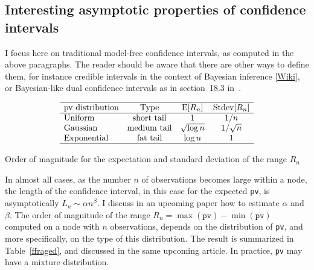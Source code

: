 \documentclass[oneside,10pt]{book}
\renewcommand{\arraystretch}{1.4} %
\begin{document}
\subsection{Interesting asymptotic properties of confidence intervals}

I focus here on traditional model-free confidence intervals, as computed in the above paragraphs. The reader should be aware that there are other ways to define them, for instance \textcolor{index}{credible intervals} in the context of
 \textcolor{index}{Bayesian inference} [\href{https://en.wikipedia.org/wiki/Bayesian_inference}{Wiki}], or 
 Bayesian-like \textcolor{index}{dual confidence intervals} as in section~18.3 in~\cite{vgelsevier}.


\renewcommand{\arraystretch}{1.2} %
\begin{center}
\begin{table}[H]
\[
\begin{array}{lccc}
\hline 
\text{pv distribution} & \text{Type} &  \text{E}[R_n] & \text{Stdev}[R_n] \\
\hline 
\text{Uniform} & \text{short tail} & 1 & 1/n \\
\text{Gaussian} & \text{medium tail} & \sqrt{\log n} & 1/\sqrt{n} \\
\text{Exponential} & \text{fat tail} & \log n & 1\\
\hline
\end{array}
\]
\caption{\label{ffraged}Order of magnitude for the expectation and standard deviation of the range $R_n$}
\end{table}
\end{center}

\renewcommand{\arraystretch}{1.0} %

In almost all cases, as the number $n$ of observations becomes large within a node, the length of the confidence interval, in this case for the expected \texttt{pv}, is asymptotically
 $L_n\sim\alpha n^\beta$. I discuss in an upcoming paper how to estimate $\alpha$ and $\beta$. The order of magnitude of the range $R_n =\max(\texttt{pv}) - \min(\texttt{pv})$
  computed on a node with $n$ observations, depends on the distribution of \texttt{pv}, and more specifically, on the type of this distribution. The result is summarized in Table~\ref{ffraged}, and discussed in the same upcoming article. In practice, \texttt{pv} may have a \textcolor{index}{mixture  distribution}.
\end{document}
